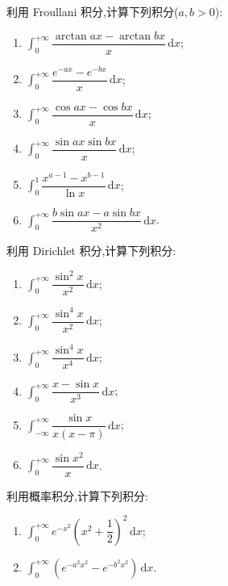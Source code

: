\documentclass[../../数学分析培优讲义.tex]{subfiles}
\begin{document}
\begin{example}
利用 Froullani 积分,计算下列积分($a,b>0$):
\begin{enumerate}[label=(\arabic*)]
    \item $\displaystyle\int_0^{+\infty}\dfrac{\arctan ax-\arctan bx}{x}\,\mathrm{d}x$;
    \item $\displaystyle\int_0^{+\infty}\dfrac{e^{-ax}-e^{-bx}}{x}\,\mathrm{d}x$;
    \item $\displaystyle\int_0^{+\infty}\dfrac{\cos ax-\cos bx}{x}\,\mathrm{d}x$;
    \item $\displaystyle\int_0^{+\infty}\dfrac{\sin ax\sin bx}{x}\,\mathrm{d}x$;
    \item $\displaystyle\int_0^1\dfrac{x^{a-1}-x^{b-1}}{\ln x}\,\mathrm{d}x$;
    \item $\displaystyle\int_0^{+\infty}\dfrac{b\sin ax-a\sin bx}{x^2}\,\mathrm{d}x$.
\end{enumerate}
\end{example}
\exampleblank

\begin{example}
利用 Dirichlet 积分,计算下列积分:
\begin{enumerate}[label=(\arabic*)]
    \item $\displaystyle\int_0^{+\infty}\dfrac{\sin^2x}{x^2}\,\mathrm{d}x$;
    \item $\displaystyle\int_0^{+\infty}\dfrac{\sin^4x}{x^2}\,\mathrm{d}x$;
    \item $\displaystyle\int_0^{+\infty}\dfrac{\sin^4x}{x^4}\,\mathrm{d}x$;
    \item $\displaystyle\int_0^{+\infty}\dfrac{x-\sin x}{x^3}\,\mathrm{d}x$;
    \item $\displaystyle\int_{-\infty}^{+\infty}\dfrac{\sin x}{x(x-\pi)}\,\mathrm{d}x$;
    \item $\displaystyle\int_0^{+\infty}\dfrac{\sin x^2}{x}\,\mathrm{d}x$.
\end{enumerate}
\end{example}
\exampleblank

\begin{example}
利用概率积分,计算下列积分:
\begin{enumerate}[label=(\arabic*)]
    \item $\displaystyle\int_0^{+\infty}e^{-x^2}\left(x^2+\dfrac{1}{2}\right)^2\,\mathrm{d}x$;
    \item $\displaystyle\int_0^{+\infty}\left(e^{-a^2x^2}-e^{-b^2x^2}\right)\,\mathrm{d}x$.
\end{enumerate}
\end{example}
\exampleblank
\end{document}
